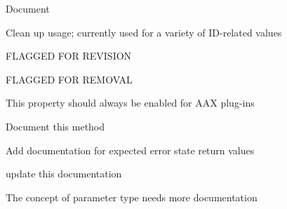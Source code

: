 \begin{DoxyRefList}
%
Document  
\item[Member \mbox{\hyperlink{a00392_aeaf9b387f902c50a8360ff423f4a1f23}{A\+A\+X\+\_\+\+C\+Selector}} ]\label{a00785__todo000005}%
%
Clean up usage; currently used for a variety of I\+D-\/related values  
\item[Member \mbox{\hyperlink{a00491_aa5ffa1ed828630b6b7a13c049d93ae87}{A\+A\+X\+\_\+\+E\+Parameter\+Orientation\+Bits}} ]\label{a00785__todo000029}%
%
F\+L\+A\+G\+G\+ED F\+OR R\+E\+V\+I\+S\+I\+ON 
\item[Member \mbox{\hyperlink{a00491_a193b89c4e2c5b57f2c4d7d5b5782fe87}{A\+A\+X\+\_\+\+E\+Parameter\+Type}} ]\label{a00785__todo000028}%
%
F\+L\+A\+G\+G\+ED F\+OR R\+E\+M\+O\+V\+AL 
\item[Member \mbox{\hyperlink{a00662_a13e384f22825afd3db6d68395b79ce0da6819867a9e86913e59decf318416d755}{A\+A\+X\+\_\+e\+Property\+\_\+\+Can\+Bypass}} ]\label{a00785__todo000051}%
%
This property should always be enabled for A\+AX plug-\/ins  
\item[Member \mbox{\hyperlink{a01665_a3922a4b9fef09e88440d7655422c2b96}{A\+A\+X\+\_\+\+I\+A\+C\+F\+Effect\+G\+UI::Set\+Control\+Highlight\+Info}} (A\+A\+X\+\_\+\+C\+Param\+ID i\+Parameter\+ID, A\+A\+X\+\_\+\+C\+Boolean i\+Is\+Highlighted, A\+A\+X\+\_\+\+E\+Highlight\+Color i\+Color)=0]\label{a00785__todo000030}%
%
Document this method 
\item[Class \mbox{\hyperlink{a01669}{A\+A\+X\+\_\+\+I\+A\+C\+F\+Effect\+Parameters}} ]\label{a00785__todo000031}%
%
Add documentation for expected error state return values 
\item[Member \mbox{\hyperlink{a01669_ac122e1a693296b059dca4350a5ff1dfe}{A\+A\+X\+\_\+\+I\+A\+C\+F\+Effect\+Parameters::Get\+Parameter\+Orientation}} (A\+A\+X\+\_\+\+C\+Param\+ID i\+Parameter\+ID, A\+A\+X\+\_\+\+E\+Parameter\+Orientation $\ast$o\+Parameter\+Orientation) const =0]\label{a00785__todo000038}%
%
update this documentation 
\item[Member \mbox{\hyperlink{a01669_ae7f6d803fa9a472a4bad583868e3b951}{A\+A\+X\+\_\+\+I\+A\+C\+F\+Effect\+Parameters::Get\+Parameter\+Type}} (A\+A\+X\+\_\+\+C\+Param\+ID i\+Parameter\+ID, A\+A\+X\+\_\+\+E\+Parameter\+Type $\ast$o\+Parameter\+Type) const =0]\label{a00785__todo000037}%
%
The concept of parameter type needs more documentation 

\end{DoxyRefList}
